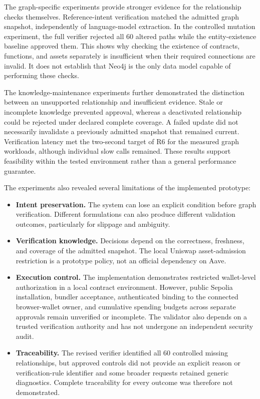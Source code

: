 The graph-specific experiments provide stronger evidence for the relationship
checks themselves. Reference-intent verification matched the admitted graph
snapshot, independently of language-model extraction. In the controlled
mutation experiment, the full verifier rejected all 60 altered paths while
the entity-existence baseline approved them. This shows why checking the
existence of contracts, functions, and assets separately is insufficient
when their required connections are invalid. It does not establish that
Neo4j is the only data model capable of performing these checks.

The knowledge-maintenance experiments further demonstrated the distinction
between an unsupported relationship and insufficient evidence. Stale or
incomplete knowledge prevented approval, whereas a deactivated relationship
could be rejected under declared complete coverage. A failed update did not
necessarily invalidate a previously admitted snapshot that remained current.
Verification latency met the two-second target of R6 for the measured graph
workloads, although individual slow calls remained. These results support
feasibility within the tested environment rather than a general performance
guarantee.

The experiments also revealed several limitations of the implemented prototype:

\begin{itemize}
    \item \textbf{Intent preservation.} The system can lose an explicit condition
    before graph verification. Different formulations can also produce
    different validation outcomes, particularly for slippage and ambiguity.

    \item \textbf{Verification knowledge.} Decisions depend on the correctness,
    freshness, and coverage of the admitted snapshot. The local Uniswap
    asset-admission restriction is a prototype policy, not an official
    dependency on Aave.

    \item \textbf{Execution control.}
The implementation demonstrates restricted wallet-level
authorization in a local contract environment. However, public
Sepolia installation, bundler acceptance, authenticated binding
to the connected browser-wallet owner, and cumulative spending
budgets across separate approvals remain unverified or
incomplete. The validator also depends on a trusted verification
authority and has not undergone an independent security audit.

    
\item \textbf{Traceability.} The revised verifier identified all 60
controlled missing relationships, but approved controls did not provide
an explicit reason or verification-rule identifier and some broader
requests retained generic diagnostics. Complete traceability for every
outcome was therefore not demonstrated.

\end{itemize}

